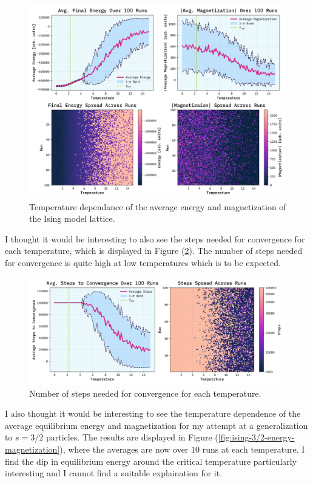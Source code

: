 \documentclass[10pt, titlepage, a4paper]{article}
\begin{document}
\begin{figure}[H]
    \centering
    \includegraphics[width=.95\textwidth]{../IsingModel/Images/avgE-avgS-vs-T-v2.png}
    \caption{Temperature dependance of the average energy and magnetization of the Ising model lattice.}
    \label{fig:ising-energy-magnetization}
\end{figure}

I thought it would be interesting to also see the steps needed for convergence for each temperature, which is displayed in Figure 
(\ref{fig:ising-steps}). The number of steps needed for convergence is quite high at low temperatures which is to be expected.

\begin{figure}[H]
    \centering
    \includegraphics[width=.95\textwidth]{../IsingModel/Images/steps-vs-T.png}
    \caption{Number of steps needed for convergence for each temperature.}
    \label{fig:ising-steps}
\end{figure}

I also thought it would be interesting to see the temperature dependence of the average equilibrium energy and magnetization for 
my attempt at a generalization to $s=3/2$ particles. The results are displayed in Figure (\ref{fig:ising-3/2-energy-magnetization}), where the 
averages are now over $10$ runs at each temperature. I find the dip in equilibrium energy around the critical temperature particularly 
interesting and I cannot find a suitable explaination for it.
\end{document}
